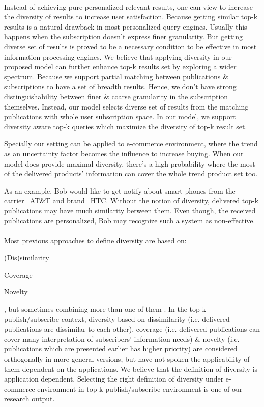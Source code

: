 \documentclass[a4paper,12pt,oneside]{book}
\theoremstyle{definition}
\theoremstyle{remark}
\begin{document}
\paragraph*{}
Instead of achieving pure personalized relevant results, one can view to increase the diversity of results to increase user satisfaction. Because getting similar top-k results is a natural drawback in most personalized query engines. Usually this happens when the subscription doesn't express finer granularity. But getting diverse set of results is proved to be a necessary condition to be effective in most information processing engines. We believe that applying diversity in our proposed model can further enhance top-k results set by exploring a wider spectrum. Because we support partial matching between publications \& subscriptions to have a set of breadth results. Hence, we don't have strong distinguishability between finer \& coarse granularity in the subscription themselves. Instead, our model selects diverse set of results from the matching publications with whole user subscription space. In our model, we support diversity aware top-k queries which maximize the diversity of top-k result set.

Specially our setting can be applied to e-commerce environment, where the trend as an uncertainty factor becomes the influence to increase buying. When our model does provide maximal diversity, there's a high probability where the most of the delivered products' information can cover the whole trend product set too.     

As an example, Bob would like to get notify about smart-phones from the carrier=AT\&T and brand=HTC. Without the notion of diversity, delivered top-k publications may have much similarity between them. Even though, the received publications are personalized, Bob may recognize such a system as non-effective. 

\paragraph*{}
Most previous approaches to define diversity are based on:
\begin{enumerate*}[label=(\roman*)]
\item (Dis)similarity
\item Coverage
\item Novelty
\end{enumerate*}
\cite{Drosou2010DiversitySurvey}, but sometimes combining more than one of them \cite{Drosou2012,Drosou2010DiversitySurvey}. In the top-k publish/subscribe context, diversity based on dissimilarity (i.e. delivered publications are dissimilar to each other), coverage (i.e. delivered publications can cover many interpretation of subscribers' information needs) \& novelty (i.e. publications which are presented earlier has higher priority) are considered orthogonally in more general versions, but have not spoken the applicability of them dependent on the applications. We believe that the definition of diversity is application dependent. Selecting the right definition of diversity under e-commerce environment in top-k publish/subscribe environment is one of our research output. 
\end{document}
